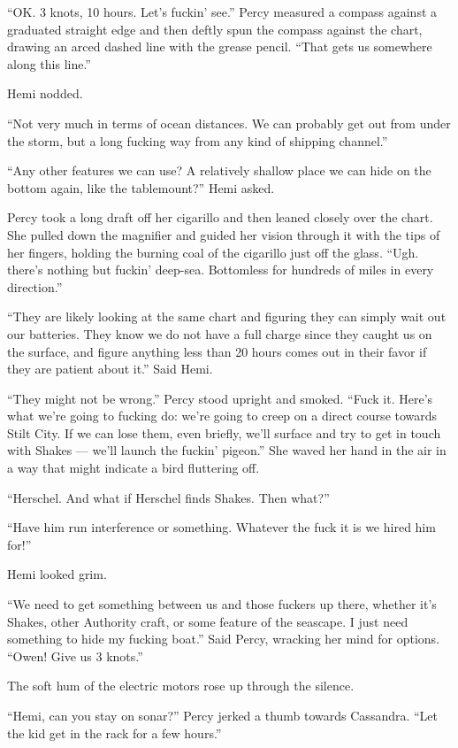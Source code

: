 \documentclass[]{scrbook}
\begin{document}
``OK. 3 knots, 10 hours. Let's fuckin' see.'' Percy measured a compass
against a graduated straight edge and then deftly spun the compass
against the chart, drawing an arced dashed line with the grease pencil.
``That gets us somewhere along this line.''

Hemi nodded.

``Not very much in terms of ocean distances. We can probably get out
from under the storm, but a long fucking way from any kind of shipping
channel.''

``Any other features we can use? A relatively shallow place we can hide
on the bottom again, like the tablemount?'' Hemi asked.

Percy took a long draft off her cigarillo and then leaned closely over
the chart. She pulled down the magnifier and guided her vision through
it with the tips of her fingers, holding the burning coal of the
cigarillo just off the glass. ``Ugh. there's nothing but fuckin'
deep-sea. Bottomless for hundreds of miles in every direction.''

``They are likely looking at the same chart and figuring they can simply
wait out our batteries. They know we do not have a full charge since
they caught us on the surface, and figure anything less than 20 hours
comes out in their favor if they are patient about it.'' Said Hemi.

``They might not be wrong.'' Percy stood upright and smoked. ``Fuck it.
Here's what we're going to fucking do: we're going to creep on a direct
course towards Stilt City. If we can lose them, even briefly, we'll
surface and try to get in touch with Shakes --- we'll launch the fuckin'
pigeon.'' She waved her hand in the air in a way that might indicate a
bird fluttering off.

``Herschel. And what if Herschel finds Shakes. Then what?''

``Have him run interference or something. Whatever the fuck it is we
hired him for!''

Hemi looked grim.

``We need to get something between us and those fuckers up there,
whether it's Shakes, other Authority craft, or some feature of the
seascape. I just need something to hide my fucking boat.'' Said Percy,
wracking her mind for options. ``Owen! Give us 3 knots.''

The soft hum of the electric motors rose up through the silence.

``Hemi, can you stay on sonar?'' Percy jerked a thumb towards Cassandra.
``Let the kid get in the rack for a few hours.''
\end{document}
